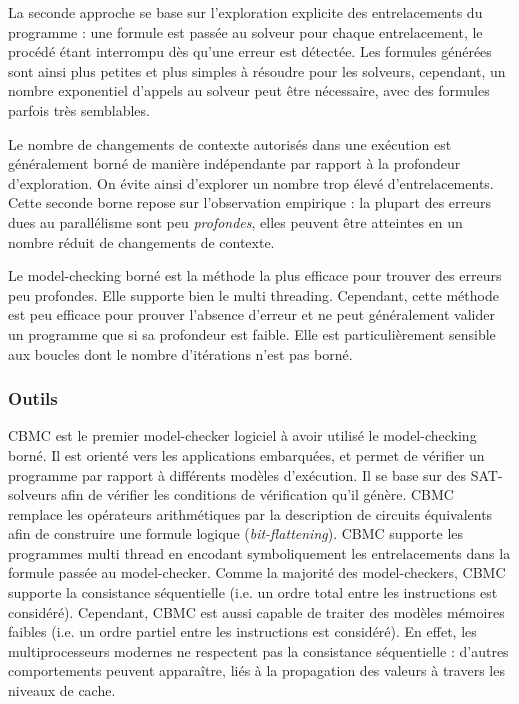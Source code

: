 La seconde approche se base sur l'exploration explicite des entrelacements du
programme : une formule est passée au solveur pour chaque entrelacement, le
procédé étant interrompu dès qu'une erreur est détectée. Les formules générées
sont ainsi plus petites et plus simples à résoudre pour les solveurs, cependant,
un nombre exponentiel d'appels au solveur peut être nécessaire, avec des
formules parfois très semblables.

Le nombre de changements de contexte autorisés dans une exécution est
généralement borné de manière indépendante par rapport à la profondeur
d'exploration. On évite ainsi d'explorer un nombre trop élevé d'entrelacements.
Cette seconde borne repose sur l'observation empirique : la plupart des erreurs
dues au parallélisme sont peu \emph{profondes}, elles peuvent être atteintes en
un nombre réduit de changements de contexte.

Le model-checking borné est la méthode la plus efficace pour trouver des
erreurs peu profondes. Elle supporte bien le multi threading. Cependant,
cette méthode est peu efficace pour prouver l'absence d'erreur et ne
peut généralement valider un programme que si sa profondeur est faible.
Elle est particulièrement sensible aux boucles dont le nombre
d'itérations n'est pas borné.

\subsubsection{Outils}

CBMC\cite{CBMC} est le premier model-checker logiciel à avoir utilisé le
model-checking borné. Il est orienté vers les applications embarquées, et permet
de vérifier un programme par rapport à différents modèles d'exécution. Il se
base sur des SAT-solveurs afin de vérifier les conditions de vérification qu'il
génère. CBMC remplace les opérateurs arithmétiques par la description de
circuits équivalents afin de construire une formule logique
(\emph{bit-flattening}). CBMC supporte les programmes multi thread en encodant
symboliquement les entrelacements dans la formule passée au model-checker. Comme
la majorité des model-checkers, CBMC supporte la consistance séquentielle (i.e.
un ordre total entre les instructions est considéré). Cependant, CBMC est aussi
capable de traiter des modèles mémoires faibles (i.e. un ordre partiel entre les
instructions est considéré). En effet, les multiprocesseurs modernes ne
respectent pas la consistance séquentielle : d'autres comportements peuvent
apparaître, liés à la propagation des valeurs à travers les niveaux de cache.

